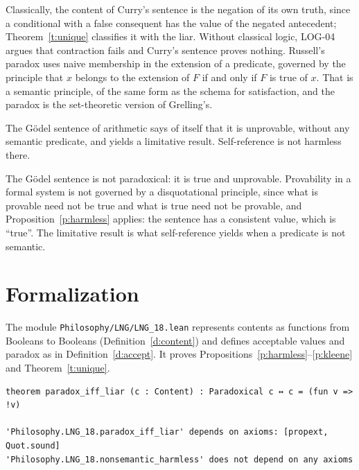 \documentclass{situationist-preprint}
\begin{document}
\begin{reply}
Classically, the content of Curry's sentence is the negation of its own truth, since a conditional with a false consequent has the value of the negated antecedent; Theorem~\ref{t:unique} classifies it with the liar. Without classical logic, LOG-04 argues that contraction fails and Curry's sentence proves nothing. Russell's paradox uses naive membership in the extension of a predicate, governed by the principle that $x$ belongs to the extension of $F$ if and only if $F$ is true of $x$. That is a semantic principle, of the same form as the schema for satisfaction, and the paradox is the set-theoretic version of Grelling's.
\end{reply}

\begin{objection}[Gödel]
The Gödel sentence of arithmetic says of itself that it is unprovable, without any semantic predicate, and yields a limitative result. Self-reference is not harmless there.
\end{objection}

\begin{reply}
The Gödel sentence is not paradoxical: it is true and unprovable. Provability in a formal system is not governed by a disquotational principle, since what is provable need not be true and what is true need not be provable, and Proposition~\ref{p:harmless} applies: the sentence has a consistent value, which is \enquote{true}. The limitative result is what self-reference yields when a predicate is not semantic.
\end{reply}

\section{Formalization}

The module \nolinkurl{Philosophy/LNG/LNG_18.lean} represents contents as functions from Booleans to Booleans (Definition~\ref{d:content}) and defines acceptable values and paradox as in Definition~\ref{d:accept}. It proves Propositions~\ref{p:harmless}--\ref{p:kleene} and Theorem~\ref{t:unique}.

\begin{lstlisting}
theorem paradox_iff_liar (c : Content) : Paradoxical c ↔ c = (fun v => !v)

'Philosophy.LNG_18.paradox_iff_liar' depends on axioms: [propext, Quot.sound]
'Philosophy.LNG_18.nonsemantic_harmless' does not depend on any axioms
\end{lstlisting}
\end{document}
